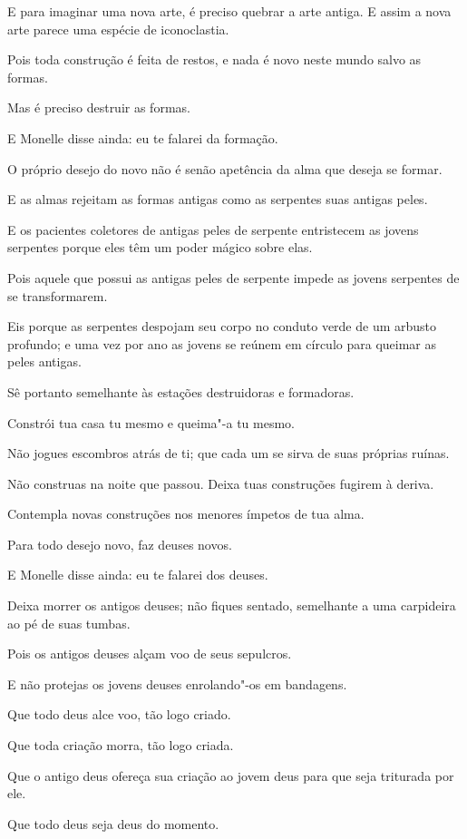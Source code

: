 E para imaginar uma nova arte, é preciso quebrar a arte antiga. E assim
a nova arte parece uma espécie de iconoclastia.

Pois toda construção é feita de restos, e nada é novo neste mundo salvo
as formas.

Mas é preciso destruir as formas.

E Monelle disse ainda: eu te falarei da formação.

O próprio desejo do novo não é senão apetência da alma que deseja se
formar.

E as almas rejeitam as formas antigas como as serpentes suas antigas
peles.

E os pacientes coletores de antigas peles de serpente entristecem as
jovens serpentes porque eles têm um poder mágico sobre elas.

Pois aquele que possui as antigas peles de serpente impede as jovens
serpentes de se transformarem.

Eis porque as serpentes despojam seu corpo no conduto verde de um
arbusto profundo; e uma vez por ano as jovens se reúnem em círculo para
queimar as peles antigas.

Sê portanto semelhante às estações destruidoras e formadoras.

Constrói tua casa tu mesmo e queima"-a tu mesmo.

Não jogues escombros atrás de ti; que cada um se sirva de suas próprias
ruínas.

Não construas na noite que passou. Deixa tuas construções fugirem à
deriva.

Contempla novas construções nos menores ímpetos de tua alma.

Para todo desejo novo, faz deuses novos.

E Monelle disse ainda: eu te falarei dos deuses.

Deixa morrer os antigos deuses; não fiques sentado, semelhante a uma
carpideira ao pé de suas tumbas.

Pois os antigos deuses alçam voo de seus sepulcros.

E não protejas os jovens deuses enrolando"-os em bandagens.

Que todo deus alce voo, tão logo criado.

Que toda criação morra, tão logo criada.

Que o antigo deus ofereça sua criação ao jovem deus para que seja
triturada por ele.

Que todo deus seja deus do momento.

